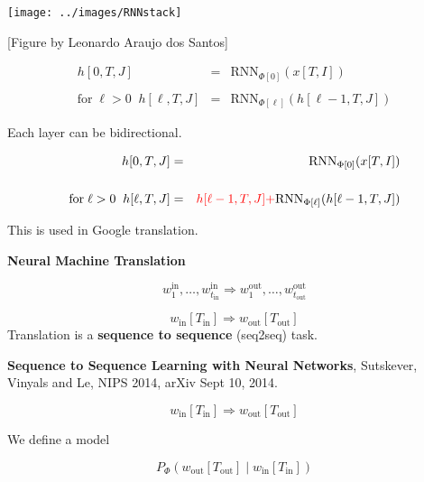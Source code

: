 {

\centerline{\texttt{[image: ../images/RNNstack]}}
\centerline{\large [Figure by Leonardo Araujo dos Santos]}

\begin{eqnarray*}
h[0,T,J] & = & \mathrm{RNN}_{\Phi[0]}(x[T,I]) \\
\\
\mbox{for} \;\ell > 0\;\;h[\ell,T,J] & = & \mathrm{RNN}_{\Phi[\ell]}(h[\ell-1,T,J])
\end{eqnarray*}

Each layer can be bidirectional.



\begin{eqnarray*}
h[0,T,J] & = & \mathrm{RNN}_{\Phi[0]}(x[T,I]) \\
\\
\mbox{for} \;\ell > 0\;\;h[\ell,T,J] & = & {\color{red} h[\ell-1,T,J] +} \mathrm{RNN}_{\Phi[\ell]}(h[\ell-1,T,J])
\end{eqnarray*}

\vfill
This is used in Google translation.

\slide{}

\centerline{\bf Neural Machine Translation}

\slide{}


$$w^{\mathrm{in}}_1,\ldots,w^{\mathrm{in}}_{t_{\mathrm{in}}} \Rightarrow w^{\mathrm{out}}_1,\ldots,w^{\mathrm{out}}_{t_{\mathrm{out}}}$$

$$w_{\mathrm{in}}[T_{\mathrm{in}}] \Rightarrow w_{\mathrm{out}}[T_{\mathrm{out}}]$$
\vfill
Translation is a {\bf sequence to sequence} (seq2seq) task.

\vfill
{\bf Sequence to Sequence Learning with Neural Networks}, Sutskever, Vinyals and Le, NIPS 2014, arXiv Sept 10, 2014.




$$w_{\mathrm{in}}[T_{\mathrm{in}}] \Rightarrow w_{\mathrm{out}}[T_{\mathrm{out}}]$$

\vfill
We define a model

\vfill
$$P_\Phi\left(w_{\mathrm{out}}[T_{\mathrm{out}}]\;|\; w_{\mathrm{in}}[T_\mathrm{in}]\right)$$

}
